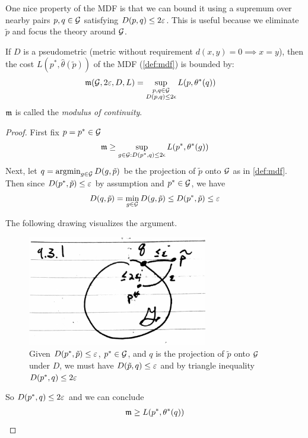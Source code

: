 One nice property of the MDF is that we can bound it using a supremum over
nearby pairs $p,q \in \mathcal{G}$ satisfying $D(p,q) \leq 2 \varepsilon$. This is useful
because we eliminate $\tilde{p}$ and focus the theory around $\mathcal{G}$.
\begin{proposition}\label{prop:mdf-modulus-error-bound}
    If $D$ is a pseudometric (metric without requirement $d(x,y) = 0 \implies x = y$),
    then the cost $L(p^*, \hat\theta(\tilde{p}))$ of the MDF (\cref{def:mdf}) is bounded by:
    \begin{align}
        \mathfrak{m}(\mathcal{G}, 2\varepsilon, D, L) &= \sup_{\substack{p, q \in \mathcal{G} \\ D(p,q) \leq 2 \epsilon}} L(p, \theta^*(q))
    \end{align}
    $\mathfrak{m}$ is called the \emph{modulus of continuity}.
\end{proposition}

\begin{proof}
    First fix $p = p^* \in \mathcal{G}$
    \begin{align}
        \mathfrak{m} \geq \sup_{g \in \mathcal{G} : D(p^*, q) \leq 2 \epsilon} L(p^*, \theta^*(g))
    \end{align}
    Next, let $q = \operatorname{argmin}_{g \in \mathcal{G}} D(g, \tilde{p})$ be the projection of $\tilde{p}$ onto $\mathcal{G}$
    as in \cref{def:mdf}.
    Then since $D(p^*, \tilde{p}) \leq \varepsilon$ by assumption and $p^* \in \mathcal{G}$, we have
    \begin{align}
        D(q, \tilde{p}) = \min_{g \in \mathcal{G}} D(g, \tilde{p}) \leq D(p^*, \tilde{p}) \leq \varepsilon
    \end{align}

    The following drawing visualizes the argument.
    \begin{figure}[H]
        \centering
        \includegraphics[width=0.7\textwidth]{figures/9-3-1.png}
        \caption{Given $D(p^*, \tilde{p}) \leq \varepsilon$, $p^* \in \mathcal{G}$, and
            $q$ is the projection of $\tilde{p}$ onto $\mathcal{G}$ under $D$, we must
            have $D(\tilde{p}, q) \leq \varepsilon$ and by triangle inequality
            $D(p^*, q) \leq 2\varepsilon$
        }
    \end{figure}

    So $D(p^*, q) \leq 2 \varepsilon$ and we can conclude
    \begin{align}
        \mathfrak{m} \geq L(p^*, \theta^*(q))
    \end{align}
\end{proof}

